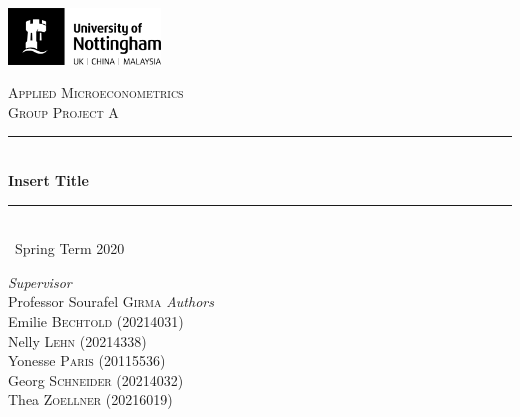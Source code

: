 \documentclass[a4paper,11pt]{scrartcl}
\newcommand{\sectionnumbering}[1]{%
  \setcounter{section}{0}%
   \renewcommand{\thesection}{\csname #1\endcsname{section}}}
\begin{document}
	\begin{titlepage}
		\newcommand{\HRule}{\rule{\linewidth}{0.5mm}}
		
	\vfill\vfill
	\includegraphics[height=1.5cm]{UoN_Logo}\\[1cm] 

	\vfill\vfill
	\center			
 
	\textsc{\Large Applied Microeconometrics}\\[0.5cm] 	
	\textsc{\large Group Project A}\\[0.5cm] 
	
	\HRule\\[0.4cm]
	{\huge\bfseries Insert Title}\\[0.4cm] 
	\HRule\\[0.4cm]
	
	{\large\ Spring Term 2020} 	
	\vfill\vfill\vfill\vfill	
	
\begin{flushleft}
			\large
			\textit{Supervisor}\\
			Professor Sourafel \textsc{Girma} 
			\vfill\vfill 
			\textit{Authors}\\
			Emilie \textsc{Bechtold} (20214031)\\
			Nelly  \textsc{Lehn} (20214338)\\
			Yonesse \textsc{Paris} (20115536)\\
			Georg  \textsc{Schneider} (20214032)\\
			Thea  \textsc{Zoellner} (20216019)
		\end{flushleft}
	\vfill 
	
\end{titlepage}


\sectionnumbering{Roman}
\tableofcontents

\newpage

\listoftables
\listoffigures
\newpage

\sectionnumbering{arabic}
\end{document}

